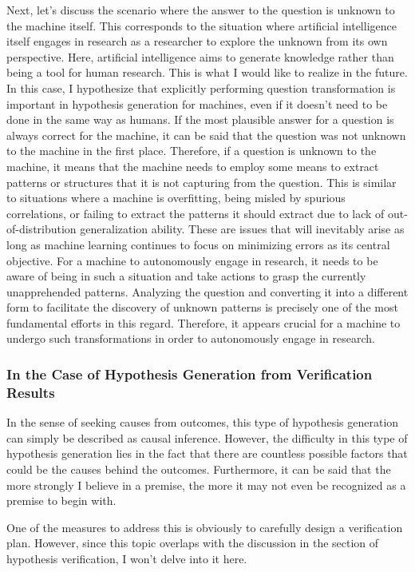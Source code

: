 Next, let's discuss the scenario where the answer to the question is unknown to the machine itself. This corresponds to the situation where artificial intelligence itself engages in research as a researcher to explore the unknown from its own perspective. Here, artificial intelligence aims to generate knowledge rather than being a tool for human research. This is what I would like to realize in the future. In this case, I hypothesize that explicitly performing question transformation is important in hypothesis generation for machines, even if it doesn't need to be done in the same way as humans. If the most plausible answer for a question is always correct for the machine, it can be said that the question was not unknown to the machine in the first place. Therefore, if a question is unknown to the machine, it means that the machine needs to employ some means to extract patterns or structures that it is not capturing from the question. This is similar to situations where a machine is overfitting, being misled by spurious correlations, or failing to extract the patterns it should extract due to lack of out-of-distribution generalization ability. These are issues that will inevitably arise as long as machine learning continues to focus on minimizing errors as its central objective. For a machine to autonomously engage in research, it needs to be aware of being in such a situation and take actions to grasp the currently unapprehended patterns. Analyzing the question and converting it into a different form to facilitate the discovery of unknown patterns is precisely one of the most fundamental efforts in this regard. Therefore, it appears crucial for a machine to undergo such transformations in order to autonomously engage in research.

\subsubsection{In the Case of Hypothesis Generation from Verification Results}
In the sense of seeking causes from outcomes, this type of hypothesis generation can simply be described as causal inference. However, the difficulty in this type of hypothesis generation lies in the fact that there are countless possible factors that could be the causes behind the outcomes. Furthermore, it can be said that the more strongly I believe in a premise, the more it may not even be recognized as a premise to begin with.

One of the measures to address this is obviously to carefully design a verification plan. However, since this topic overlaps with the discussion in the section of hypothesis verification, I won't delve into it here.

